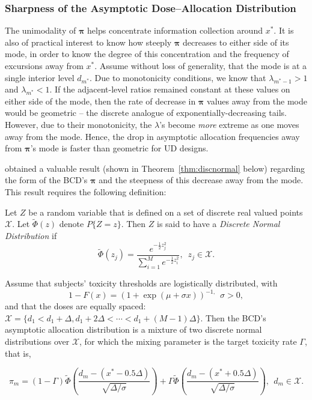 \subsubsection{Sharpness of the Asymptotic Dose--Allocation Distribution}

The unimodality of $\boldsymbol{\pi}$ helps concentrate information collection around $x^*$. It is also of practical interest to know how steeply $\boldsymbol{\pi}$ decreases to either side of its mode, in order to know the degree of this concentration and the frequency of excursions away from $x^*$. Assume without loss of generality, that the mode is at a single interior level $d_{m^*}$. Due to monotonicity conditions, we know that $\lambda_{m^*-1}>1$ and $\lambda_{m^*}<1$. If the adjacent-level ratios remained constant at these values on either side of the mode, then the rate of decrease in $\boldsymbol{\pi}$ values away from the mode would be geometric -- the discrete analogue of exponentially-decreasing tails. However, due to their monotonicity, the $\lambda$'s become \emph{more} extreme as one moves away from the mode. Hence, the drop in asymptotic allocation frequencies away from $\boldsymbol{\pi}$'s mode is faster than geometric for UD designs.

\cite{Durh:Flou:rand:1994} obtained a valuable result (shown in Theorem~\ref{thm:discnormal} below) regarding the form of the BCD's $\boldsymbol{\pi}$ and the steepness of this decrease away from the mode. This result requires the following definition:

\begin{defn}
Let $Z$ be a random variable that is defined on a set of discrete
real valued points $\mathcal{X}$.  Let $\tilde{\Phi}(z)$ denote $P\{Z=z\}$.  Then $Z$ is said to have a \emph{Discrete Normal Distribution} if
\begin{equation*}
\tilde{\Phi}(z_j)=\frac{e^{-\frac{1}{2}z_j^2}}{\sum_{i=1}^Me^{-\frac{1}{2}z_i^2}},\,\,\,z_j\in\mathcal{X}.
\end{equation*}
\end{defn}


\begin{thm}\label{thm:discnormal}
Assume that subjects' toxicity thresholds are logistically distributed, with $$1-F(x)=(1+\exp(\mu+\sigma x))^{-1,}\ \ \sigma>0,$$ and that the doses are equally spaced: $\mathcal{X}=\{d_1<d_1+\Delta,d_1+2\Delta<\cdots<d_1+(M-1)\Delta\}.$ Then the BCD's asymptotic allocation distribution is a mixture of two discrete normal distributions over $\mathcal{X}$,  for which the mixing parameter is the target toxicity rate $\Gamma$, that is,

\begin{equation}\label{eq:discnormal}
\pi_m=(1-\Gamma)\tilde{\Phi}\left(\frac{d_m-(x^*-0.5\Delta)}{\sqrt{\Delta/\sigma}}\right)+
\Gamma\tilde{\Phi}\left(\frac{d_m-(x^*+0.5\Delta)}{\sqrt{\Delta/\sigma}}\right),\ \ d_m\in\mathcal{X}.
\end{equation}
\end{thm}

